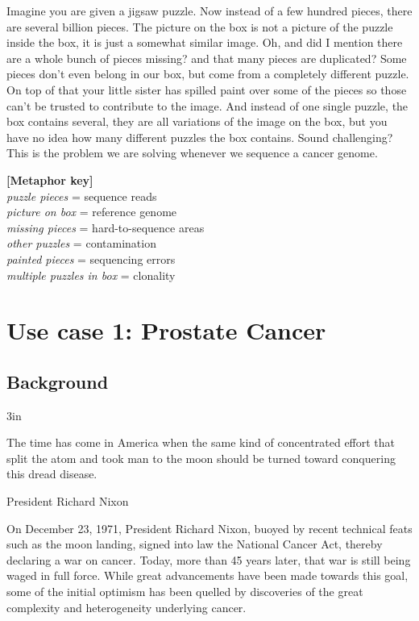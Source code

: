 \begin{center}
\begin{minipage}{6in}
\begin{center}
{\vspace*{0.5cm}

Imagine you are given a jigsaw puzzle. Now instead of a few hundred pieces, there are several billion pieces. The picture on the box is not a picture of the puzzle inside the box,
it is just a somewhat similar image. Oh, and did I mention there are a whole bunch of pieces missing? and that many pieces are duplicated? Some pieces don't even belong in our box,
but come from a completely different puzzle. On top of that your little sister has spilled paint over some of the pieces so those can't be trusted to contribute to the image. And instead of one
single puzzle, the box contains several, they are all variations of the image on the box, but you have no idea how many different puzzles the box contains. Sound challenging? This is the problem we are solving whenever we sequence a cancer genome.

\vspace*{0.5cm}
\textbf{[Metaphor key]} \\
\textit{puzzle pieces} = sequence reads \\
\textit{picture on box} = reference genome \\
\textit{missing pieces} = hard-to-sequence areas \\
\textit{other puzzles} = contamination \\
\textit{painted pieces} = sequencing errors \\
\textit{multiple puzzles in box} = clonality
}

\end{center}
\end{minipage}
\end{center}



\newpage
\section{Use case 1: Prostate Cancer}

\subsection{Background}
\epigraph{3in}{The time has come in America when the same kind of concentrated effort that split the atom and took man to the moon should be turned toward conquering this dread disease.}{President Richard Nixon}

On December 23, 1971, President Richard Nixon, buoyed by recent technical feats such as the moon landing, signed into law the National Cancer Act, thereby declaring a war on cancer. Today, more than 45 years later, that war is still being waged in full force. While great advancements have been made towards this goal, some of the initial optimism has been quelled by discoveries of the great complexity and heterogeneity underlying cancer.

